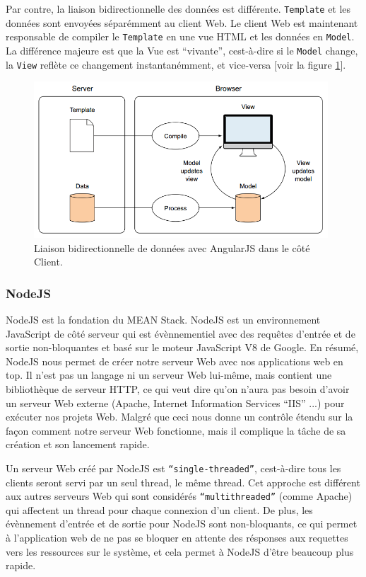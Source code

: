 \documentclass[a4paper,11pt,oneside]{report}
\begin{document}
Par contre, la liaison bidirectionnelle des données est différente. \texttt{Template} et les données sont envoyées séparémment au client Web. Le client Web est maintenant responsable de compiler le \texttt{Template} en une vue HTML et les données en \texttt{Model}. La différence majeure est que la Vue est ``vivante'', cest-à-dire si le \texttt{Model} change, la \texttt{View} reflète ce changement instantanémment, et vice-versa [voir la figure \ref{fig:two-way-data-binding}].

\begin{figure}[H]
    \centering
    \includegraphics[width=11cm]{two-way-data-binding.png}
    \caption{Liaison bidirectionnelle de données avec AngularJS dans le côté Client.}
    \label{fig:two-way-data-binding}
\end{figure}

\subsubsection{NodeJS}

NodeJS est la fondation du MEAN Stack. NodeJS est un environnement JavaScript de côté serveur qui est évènnementiel avec des requêtes d'entrée et de sortie non-bloquantes et basé sur le moteur JavaScript V8 de Google. En résumé, NodeJS nous permet de créer notre serveur Web avec nos applications web en top. Il n'est pas un langage ni un serveur Web lui-même, mais contient une bibliothèque de serveur HTTP, ce qui veut dire qu'on n'aura pas besoin d'avoir un serveur Web externe (Apache, Internet Information Services ``IIS'' ...) pour exécuter nos projets Web. Malgré que ceci nous donne un contrôle étendu sur la façon comment notre serveur Web fonctionne, mais il complique la tâche de sa création et son lancement rapide.
\newline

Un serveur Web créé par NodeJS est \texttt{``single-threaded''}, cest-à-dire tous les clients seront servi par un seul thread, le même thread. Cet approche est différent aux autres serveurs Web qui sont considérés \texttt{``multithreaded''} (comme Apache) qui affectent un thread pour chaque connexion d'un client. De plus, les évènnement d'entrée et de sortie pour NodeJS sont non-bloquants\cite{blockingVSnonBlocking}, ce qui permet à l'application web de ne pas se bloquer en attente des résponses aux requettes vers les ressources sur le système, et cela permet à NodeJS d'être beaucoup plus rapide\cite{nodeJSvsPHP}.
\newline
\end{document}
